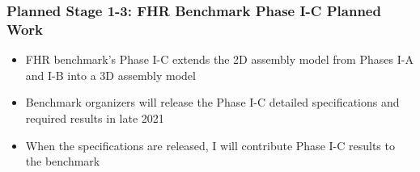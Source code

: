 \begin{frame}
    \frametitle{Planned Stage 1-3: FHR Benchmark Phase I-C Planned Work}
        \begin{itemize}
            \item FHR benchmark's Phase I-C extends the 2D assembly model from 
            Phases I-A and I-B into a 3D assembly model
            \item Benchmark organizers will release the Phase I-C detailed 
            specifications and required results in late 2021
            \item When the specifications are released, I will contribute Phase I-C
            results to the benchmark
        \end{itemize}
\end{frame}